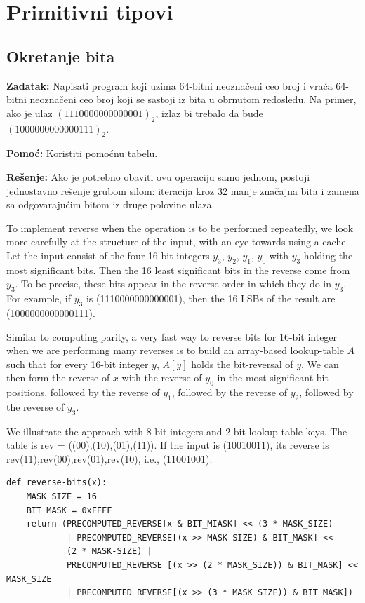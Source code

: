 \documentclass[11pt,a4paper]{article}
\begin{document}
\section{Primitivni tipovi}

\subsection{Okretanje bita}

\textbf{Zadatak:} Napisati program koji uzima 64-bitni neoznačeni ceo broj i
vraća 64-bitni neoznačeni ceo broj koji se sastoji iz bita u obrnutom redosledu.
Na primer, ako je ulaz $(1110000000000001)_2$, izlaz bi trebalo da bude
$(1000000000000111)_2$.

\textbf{Pomoć:} Koristiti pomoćnu tabelu.

\textbf{Rešenje:} Ako je potrebno obaviti ovu operaciju samo jednom, postoji
jednostavno rešenje grubom silom: iteracija kroz 32 manje značajna bita i zamena
sa odgovarajućim bitom iz druge polovine ulaza.

To implement reverse when the operation is to be performed repeatedly, we look
more carefully at the structure of the input, with an eye towards using a
cache. Let the input consist of the four 16-bit integers $y_3$, $y_2$, $y_1$,
$y_0$ with $y_3$ holding the most significant bits. Then the 16 least 
significant bits in the reverse come from $y_3$. To be precise, these bits
appear in the reverse order in which they do in $y_3$. For example, if $y_3$
is (1110000000000001), then the 16 LSBs of the result are (1000000000000111).

Similar to computing parity, a very fast way to reverse bits for 16-bit
integer when we are performing many reverses is to build an array-based
lookup-table $A$ such that for every 16-bit integer $y$, $A[y]$ holds the
bit-reversal of $y$. We can then form the reverse of $x$ with the reverse of
$y_0$ in the most significant bit positions, followed by the reverse of $y_1$,
followed by the reverse of $y_2$, followed by the reverse of $y_3$.

We illustrate the approach with 8-bit integers and 2-bit lookup table keys.
The table is rev = ((00),(10),(01),(11)). If the input is (10010011), its
reverse is rev(11),rev(00),rev(01),rev(10), i.e., (11001001).

\begin{verbatim}
def reverse-bits(x):
    MASK_SIZE = 16
    BIT_MASK = 0xFFFF
    return (PRECOMPUTED_REVERSE[x & BIT_MIASK] << (3 * MASK_SIZE)
            | PRECOMPUTED_REVERSE[(x >> MASK-SIZE) & BIT_MASK] <<
            (2 * MASK-SIZE) |
            PRECOMPUTED_REVERSE [(x >> (2 * MASK_SIZE)) & BIT_MASK] << MASK_SIZE
            | PRECOMPUTED_REVERSE[(x >> (3 * MASK_SIZE)) & BIT_MASK])
\end{verbatim}
\end{document}

